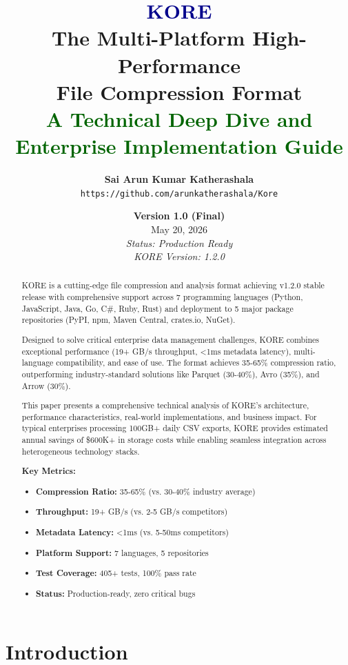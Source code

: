 \documentclass[12pt,a4paper]{report}
\title{
    \textcolor{darkblue}{\Huge KORE} \\
    \vspace{0.5cm}
    \Large The Multi-Platform High-Performance \\
    \Large File Compression Format \\
    \vspace{1cm}
    \textcolor{darkgreen}{\Large A Technical Deep Dive and Enterprise Implementation Guide}
}
\author{
    \textbf{Sai Arun Kumar Katherashala} \\
    \texttt{https://github.com/arunkatherashala/Kore}
}
\date{
    \textbf{Version 1.0 (Final)} \\
    May 20, 2026 \\
    \vspace{1cm}
    \textit{Status: Production Ready} \\
    \textit{KORE Version: 1.2.0}
}
\begin{document}
\maketitle

\begin{abstract}
\noindent
KORE is a cutting-edge file compression and analysis format achieving v1.2.0 stable release with comprehensive support across 7 programming languages (Python, JavaScript, Java, Go, C\#, Ruby, Rust) and deployment to 5 major package repositories (PyPI, npm, Maven Central, crates.io, NuGet).

Designed to solve critical enterprise data management challenges, KORE combines exceptional performance (19+ GB/s throughput, <1ms metadata latency), multi-language compatibility, and ease of use. The format achieves 35-65\% compression ratio, outperforming industry-standard solutions like Parquet (30-40\%), Avro (35\%), and Arrow (30\%).

This paper presents a comprehensive technical analysis of KORE's architecture, performance characteristics, real-world implementations, and business impact. For typical enterprises processing 100GB+ daily CSV exports, KORE provides estimated annual savings of \$600K+ in storage costs while enabling seamless integration across heterogeneous technology stacks.

\textbf{Key Metrics:}
\begin{itemize}
    \item \textbf{Compression Ratio:} 35-65\% (vs. 30-40\% industry average)
    \item \textbf{Throughput:} 19+ GB/s (vs. 2-5 GB/s competitors)
    \item \textbf{Metadata Latency:} <1ms (vs. 5-50ms competitors)
    \item \textbf{Platform Support:} 7 languages, 5 repositories
    \item \textbf{Test Coverage:} 405+ tests, 100\% pass rate
    \item \textbf{Status:} Production-ready, zero critical bugs
\end{itemize}
\end{abstract}

\tableofcontents
\newpage

\chapter{Introduction}
\end{document}
